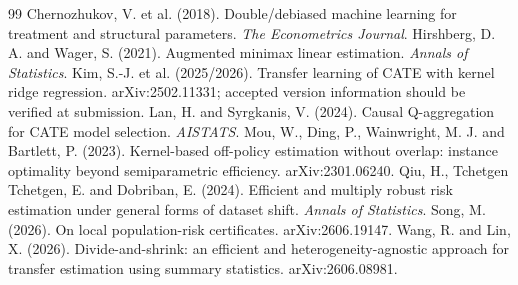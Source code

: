 \documentclass[UTF8,12pt]{ctexart}
\begin{document}
\begin{thebibliography}{99}
 Chernozhukov, V. et al. (2018). Double/debiased machine learning for treatment and structural parameters. \emph{The Econometrics Journal}.
 Hirshberg, D. A. and Wager, S. (2021). Augmented minimax linear estimation. \emph{Annals of Statistics}.
 Kim, S.-J. et al. (2025/2026). Transfer learning of CATE with kernel ridge regression. arXiv:2502.11331; accepted version information should be verified at submission.
 Lan, H. and Syrgkanis, V. (2024). Causal Q-aggregation for CATE model selection. \emph{AISTATS}.
 Mou, W., Ding, P., Wainwright, M. J. and Bartlett, P. (2023). Kernel-based off-policy estimation without overlap: instance optimality beyond semiparametric efficiency. arXiv:2301.06240.
 Qiu, H., Tchetgen Tchetgen, E. and Dobriban, E. (2024). Efficient and multiply robust risk estimation under general forms of dataset shift. \emph{Annals of Statistics}.
 Song, M. (2026). On local population-risk certificates. arXiv:2606.19147.
 Wang, R. and Lin, X. (2026). Divide-and-shrink: an efficient and heterogeneity-agnostic approach for transfer estimation using summary statistics. arXiv:2606.08981.
\end{thebibliography}
\end{document}
